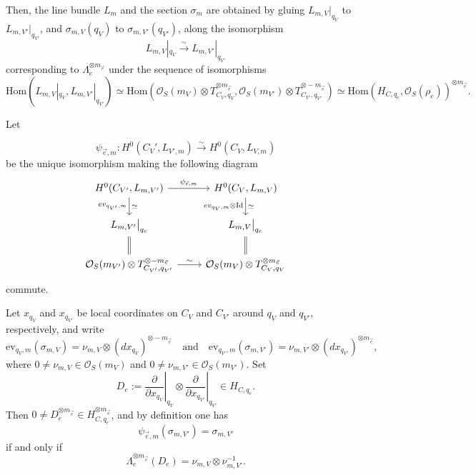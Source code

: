 \documentclass{article}
\def\cO{\mathcal{O}}
\begin{document}
Then, the line bundle $L_m$ and the section $\sigma_m$ are obtained by gluing $L_{m,V}|_{q_V}$ to $L_{m,V'}|_{q_{V'}}$, and $\sigma_{m,V}(q_V)$ to $\sigma_{m,V'}(q_{V'})$, along the isomorphism \begin{equation}\label{eqn: glueing_LmV}
    L_{m,V}|_{q_V} \xrightarrow{\sim} L_{m,V'}|_{q_{V'}}
\end{equation}
corresponding to $\Lambda_e^{\otimes m_{\vec{e}}}$ under the sequence of isomorphisms
\begin{equation}\label{eqn: glueing LmV}
   \mathrm{Hom}(L_{m,V}|_{q_V}, L_{m,V'}|_{q_{V'}}) \simeq \mathrm{Hom}(\cO_S(m_V) \otimes T_{C_V,q_V}^{\otimes m_{\vec{e}}}, \cO_S(m_{V'}) \otimes T_{C_{V'},q_{V'}}^{\otimes -m_{\vec{e}} }) \simeq \mathrm{Hom}(H_{C,q_e}, \cO_S(\rho_e))^{\otimes m_{\vec{e}}}. 
\end{equation}


Let

\begin{equation}\label{eqn: iso psi}
\psi_{\vec{e},m}: H^0(C_V',L_{V',m}) \xrightarrow{\sim} H^0(C_{V},L_{V,m})
\end{equation}
be the unique isomorphism making the following diagram 
\[
\begin{tikzcd}
H^0(C_{V'}, L_{m,V'}) 
\arrow[r, "\psi_{\vec{e},m}"] 
\arrow[d, "\simeq", "ev_{q_{V'},m}"']
& H^0(C_V, L_{m,V}) 
\arrow[d, "\simeq", "ev_{q_V,m} \otimes \mathrm{Id}"'] \\
L_{m,V'}\big|_{q_e} 
\arrow[d, equals]
& L_{m,V}\big|_{q_e} 
\arrow[d, equals] \\
 \cO_S(m_{V'}) \otimes T^{\otimes -m_{\vec{e}}}_{C_{V'},q_{V'}}
\arrow[r, "\sim"] 
& \cO_S(m_V) \otimes  T^{\otimes m_{\vec{e}}}_{C_V,q_V}
\end{tikzcd}
\]
commute. 

Let $x_{q_V}$ and $x_{q_{V'}}$ be local coordinates on $C_V$ and $C_{V'}$ around $q_V$ and $q_{V'}$, respectively, and write
\begin{equation}\label{eqn: coordinates for sigmas}
\mathrm{ev}_{q_V,m}(\sigma_{m,V})
= \nu_{m,V} \otimes (dx_{q_V})^{\otimes - m_{\vec{e}}}
\quad \text{and} \quad
\mathrm{ev}_{q_{V'},m}(\sigma_{m,V'})
= \nu_{m,V'} \otimes (dx_{q_{V'}})^{\otimes m_{\vec{e}}},
\end{equation}
where $0 \neq \nu_{m,V} \in \cO_S(m_{V})$ and $ 0 \neq \nu_{m,V'} \in \cO_S(m_{V'})$. Set
\[
D_e := \left.\frac{\partial}{\partial x_{q_V}}\right|_{q_V}
\otimes 
\left.\frac{\partial}{\partial x_{q_{V'}}}\right|_{q_{V'}}
\in H_{C,q_e}.
\]
Then \(0 \neq D_e^{\otimes m_{\vec e}} \in H_{C,q_e}^{\otimes m_{\vec e}}\), and by definition one has
\[
\psi_{\vec e,m}(\sigma_{m,V'})
= \sigma_{m,V'} 
\]
if and only if
\begin{equation}\label{eqn: constraint for number of maps}
\Lambda_e^{\otimes m_{\vec{e}}}(D_e)=\nu_{m,V} \otimes \nu_{m,V'}^{-1}.
\end{equation}
\end{document}
